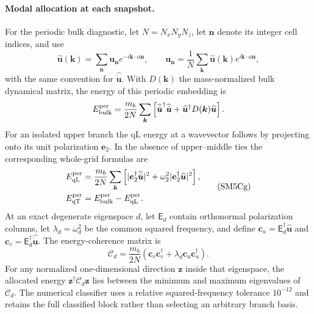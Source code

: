\documentclass[10pt,aps,onecolumn,notitlepage,nofootinbib]{revtex4-2}
\newcommand{\vk}{\bm k}
\newcommand{\qT}{\mathrm{qT}}
\newcommand{\qL}{\mathrm{qL}}
\begin{document}
\paragraph*{Modal allocation at each snapshot.}
For the periodic bulk diagnostic, let $N=N_xN_yN_z$, let $\bm n$ denote its integer cell indices, and use
\begin{equation}
 \widehat{\bm u}(\vk)=\sum_{\bm n}\bm u_{\bm n}e^{-i\vk\cdot a\bm n},
 \qquad
 \bm u_{\bm n}=\frac{1}{N}\sum_{\vk}\widehat{\bm u}(\vk)e^{i\vk\cdot a\bm n},
 \label{eq:s7-bulk-dft}
\end{equation}
with the same convention for $\widehat{\dot{\bm u}}$. With $D(\vk)$ the mass-normalized bulk dynamical matrix, the energy of this periodic embedding is
\begin{equation}
 E_{\rm bulk}^{\rm per}
 =\frac{m_b}{2N}\sum_{\vk}
 \left[
  \widehat{\dot{\bm u}}^{\dagger}\widehat{\dot{\bm u}}
  +\widehat{\bm u}^{\dagger}D(\vk)\widehat{\bm u}
 \right].
 \label{eq:s7-periodic-total-energy}
\end{equation}
For an isolated upper branch the qL energy at a wavevector follows by projecting onto its unit polarization $\bm e_2$. In the absence of upper--middle ties the corresponding whole-grid formulas are
\begin{equation*}
 \begin{aligned}
 E_{\qL}^{\rm per}
 &=\frac{m_b}{2N}\sum_{\bm k}
 \left[|\bm e_2^\dagger\widehat{\dot{\bm u}}|^2+\omega_2^2|\bm e_2^\dagger\widehat{\bm u}|^2\right],\\
 E_{\qT}^{\rm per}&=E_{\rm bulk}^{\rm per}-E_{\qL}^{\rm per}.
 \end{aligned}
 \tag{SM5Cg}\label{eq:s7-modal-energy}
\end{equation*}
At an exact degenerate eigenspace $d$, let $\mathsf E_d$ contain orthonormal polarization columns, let $\lambda_d=\omega_d^2$ be the common squared frequency, and define $\bm c_u=\mathsf E_d^\dagger\widehat{\bm u}$ and $\bm c_v=\mathsf E_d^\dagger\widehat{\dot{\bm u}}$. The energy-coherence matrix is
\begin{equation}
 \mathcal C_d=\frac{m_b}{2N}
 \left(\bm c_v\bm c_v^\dagger+\lambda_d\bm c_u\bm c_u^\dagger\right).
\end{equation}
For any normalized one-dimensional direction $\bm z$ inside that eigenspace, the allocated energy $\bm z^\dagger\mathcal C_d\bm z$ lies between the minimum and maximum eigenvalues of $\mathcal C_d$. The numerical classifier uses a relative squared-frequency tolerance $10^{-12}$ and retains the full classified block rather than selecting an arbitrary branch basis.
\end{document}
